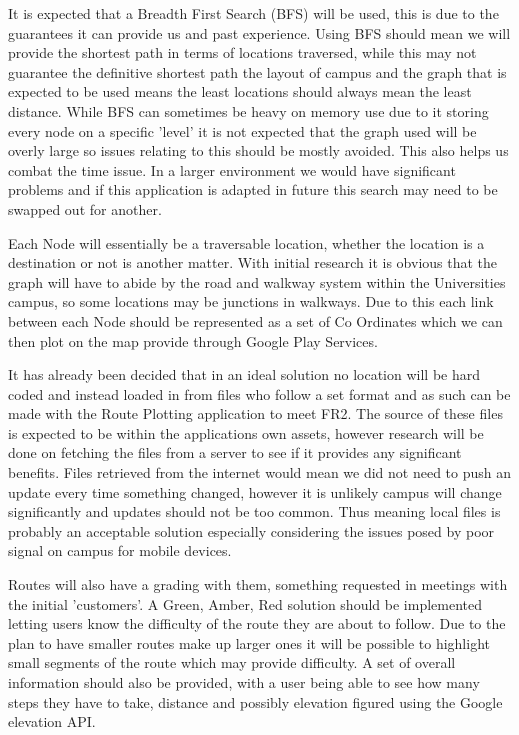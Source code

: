 It is expected that a Breadth First Search (BFS) will be used, this is due to the guarantees it can provide us and past experience. Using BFS should mean we will provide the shortest path in terms of locations traversed, while this may not guarantee the definitive shortest path the layout of campus and the graph that is expected to be used means the least locations should always mean the least distance. While BFS can sometimes be heavy on memory use due to it storing every node on a specific 'level' it is not expected that the graph used will be overly large so issues relating to this should be mostly avoided. This also helps us combat the time issue. In a larger environment we would have significant problems and if this application is adapted in future this search may need to be swapped out for another.

Each Node will essentially be a traversable location, whether the location is a destination or not is another matter. With initial research it is obvious that the graph will have to abide by the road and walkway system within the Universities campus, so some locations may be junctions in walkways. Due to this each link between each Node should be represented as a set of Co Ordinates which we can then plot on the map provide through Google Play Services. 

It has already been decided that in an ideal solution no location will be hard coded and instead loaded in from files who follow a set format and as such can be made with the Route Plotting application to meet FR2. The source of these files is expected to be within the applications own assets, however research will be done on fetching the files from a server to see if it provides any significant benefits. Files retrieved from the internet would mean we did not need to push an update every time something changed, however it is unlikely campus will change significantly and updates should not be too common. Thus meaning local files is probably an acceptable solution especially considering the issues posed by poor signal on campus for mobile devices. 

Routes will also have a grading with them, something requested in meetings with the initial 'customers'. A Green, Amber, Red solution should be implemented letting users know the difficulty of the route they are about to follow. Due to the plan to have smaller routes make up larger ones it will be possible to highlight small segments of the route which may provide difficulty. A set of overall information should also be provided, with a user being able to see how many steps they have to take, distance and possibly elevation figured using the Google elevation API. 

